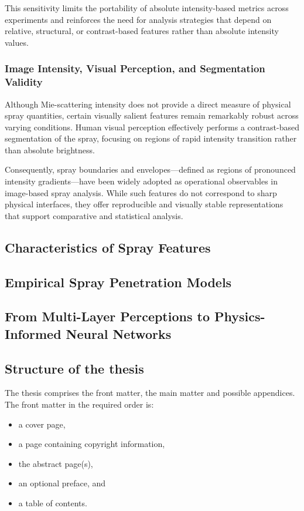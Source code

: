 \documentclass[english, 12pt, a4paper, elec, utf8, a-2b, online]{aaltothesis}
\begin{document}
This sensitivity limits the portability of absolute intensity-based metrics across experiments and reinforces the need for analysis strategies that depend on relative, structural, or contrast-based features rather than absolute intensity values.\\


\subsubsection{Image Intensity, Visual Perception, and Segmentation Validity}

Although Mie-scattering intensity does not provide a direct measure of physical spray quantities, certain visually salient features remain remarkably robust across varying conditions. Human visual perception effectively performs a contrast-based segmentation of the spray, focusing on regions of rapid intensity transition rather than absolute brightness.

Consequently, spray boundaries and envelopes—defined as regions of pronounced intensity gradients—have been widely adopted as operational observables in image-based spray analysis. While such features do not correspond to sharp physical interfaces, they offer reproducible and visually stable representations that support comparative and statistical analysis.



\subsection{Characteristics of Spray Features}
\subsection{Empirical Spray Penetration Models}
\subsection{From Multi-Layer Perceptions to Physics-Informed Neural Networks}


\subsection{Structure of the thesis}

The thesis comprises the front matter, the main matter and possible appendices.
The front matter in the required order is:

\begin{itemize}
	\item a cover page,
	\item a page containing copyright information,
	\item the abstract page(s),
	\item an optional preface, and
	\item a table of contents.
\end{itemize}
\end{document}
